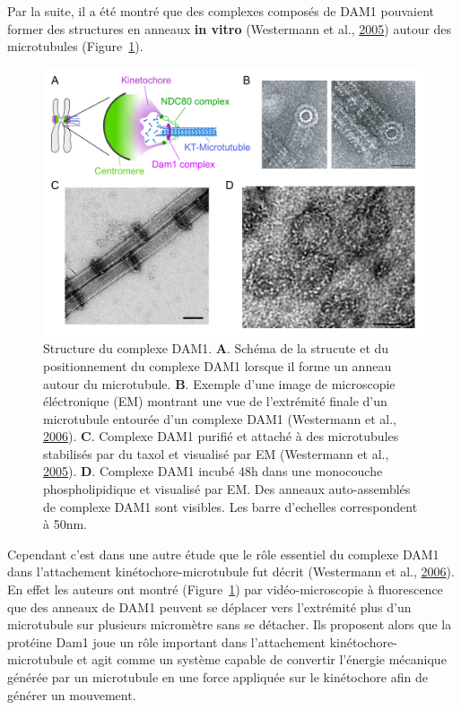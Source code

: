 \documentclass[12pt,a4paper,twoside,openright]{book}
\begin{document}
Par la suite, il a été montré que des complexes composés de DAM1
pouvaient former des structures en anneaux \textbf{in vitro} (Westermann
et al., \protect\hyperlink{ref-Westermann2005}{2005}) autour des
microtubules (Figure~\ref{fig:dam1-struct}).

\begin{figure}[htbp]
\centering
\includegraphics{figures/annexes/dam1-struct.png}
\caption{\label{fig:dam1-struct}Structure du complexe DAM1. \textbf{A}.
Schéma de la strucute et du positionnement du complexe DAM1 lorsque il
forme un anneau autour du microtubule. \textbf{B}. Exemple d'une image
de microscopie éléctronique (EM) montrant une vue de l'extrémité finale
d'un microtubule entourée d'un complexe DAM1 (Westermann et al.,
\protect\hyperlink{ref-Westermann2006}{2006}). \textbf{C}. Complexe DAM1
purifié et attaché à des microtubules stabilisés par du taxol et
visualisé par EM (Westermann et al.,
\protect\hyperlink{ref-Westermann2005}{2005}). \textbf{D}. Complexe DAM1
incubé 48h dans une monocouche phospholipidique et visualisé par EM. Des
anneaux auto-assemblés de complexe DAM1 sont visibles. Les barre
d'echelles correspondent à 50nm.}
\end{figure}

Cependant c'est dans une autre étude que le rôle essentiel du complexe
DAM1 dans l'attachement kinétochore-microtubule fut décrit (Westermann
et al., \protect\hyperlink{ref-Westermann2006}{2006}). En effet les
auteurs ont montré (Figure~\ref{fig:dam1-struct}) par vidéo-microscopie
à fluorescence que des anneaux de DAM1 peuvent se déplacer vers
l'extrémité plus d'un microtubule sur plusieurs micromètre sans se
détacher. Ils proposent alors que la protéine Dam1 joue un rôle
important dans l'attachement kinétochore-microtubule et agit comme un
système capable de convertir l'énergie mécanique générée par un
microtubule en une force appliquée sur le kinétochore afin de générer un
mouvement.
\end{document}
